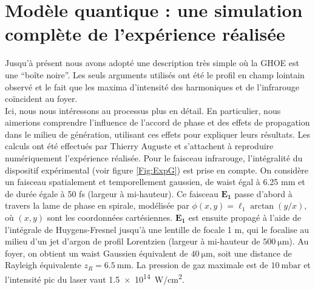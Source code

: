 \section{Modèle quantique : une simulation complète de l'expérience réalisée}
Jusqu'à présent nous avons adopté une description très simple où la GHOE est une ``boîte noire''. Les seuls arguments utilisés ont été le profil en champ lointain observé et le fait que les maxima d'intensité des harmoniques et de l'infrarouge coïncident au foyer.\\
Ici, nous nous intéressons au processus plus en détail. En particulier, nous aimerions comprendre l'influence de l'accord de phase et des effets de propagation dans le milieu de génération,  utilisant ces effets pour expliquer leurs résultats. Les calculs ont été effectués par Thierry Auguste et s'attachent à reproduire numériquement l'expérience réalisée. Pour le faisceau infrarouge, l'intégralité du dispositif expérimental (voir figure \ref{Fig:ExpG}) est prise en compte. On considère un faisceau spatialement et temporellement gaussien, de waist égal à 6.25 mm et de durée égale à 50 fs (largeur à mi-hauteur). Ce faisceau $\bm{E_1}$ passe d'abord à travers la lame de phase en spirale, modélisée par $\phi(x,y) = \ell_1 \arctan{(y/x)}$, où $(x,y)$ sont les coordonnées cartésiennes. $\bm{E_1}$ est ensuite propagé à l'aide de l'intégrale de Huygens-Fresnel jusqu'à une lentille de focale 1 m, qui le focalise au milieu d'un jet d'argon de profil Lorentzien (largeur à mi-hauteur de $\SI{500}{\micro\meter}$). Au foyer, on obtient un waist Gaussien équivalent de $\SI{40}{\micro\meter}$, soit une distance de Rayleigh équivalente $z_R=\SI{6,5}\mm$. La pression de gaz maximale est de $\SI{10}{\milli\bar}$ et l'intensité pic du laser vaut \SI{1,5e14}{W/cm^2}.


